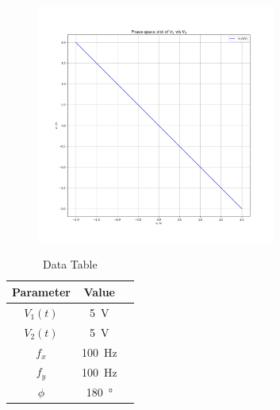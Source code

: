 \documentclass[a4paper,12pt]{article}
\begin{document}
\begin{figure}[htbp]
\begin{center}
    \includegraphics[width=0.7\textwidth]{figs/5/pplot.png}
\end{center}
\end{figure}


\begin{table}[htbp]
    \centering
    \begin{tabular}{|c|c|c|}
        \hline
        \textbf{Parameter} & \textbf{Value} \\
        \hline
        $V_1(t)$ & \SI{5}{\volt} \\
        $V_2(t)$ & \SI{5}{\volt} \\
        $f_x$ & \SI{100}{\hertz} \\
        $f_y$ & \SI{100}{\hertz} \\
        $\phi$ & \SI{180}{\degree} \\
        \hline
    \end{tabular}
    \caption{Data Table}
    \label{tab:sample}
\end{table}
\end{document}
